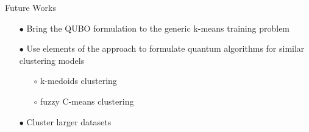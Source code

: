 	\begin{frame}{Future Works}
		\begin{itemize}
			\item[$\bullet$] Bring the QUBO formulation to the generic k-means training problem
			\item[$\bullet$] Use elements of the approach to formulate quantum algorithms for similar clustering models
			\begin{itemize}
				\item[$\circ$] k-medoids clustering
				\item[$\circ$] fuzzy C-means clustering
			\end{itemize}
			\item[$\bullet$] Cluster larger datasets 
		\end{itemize}
	\end{frame}



